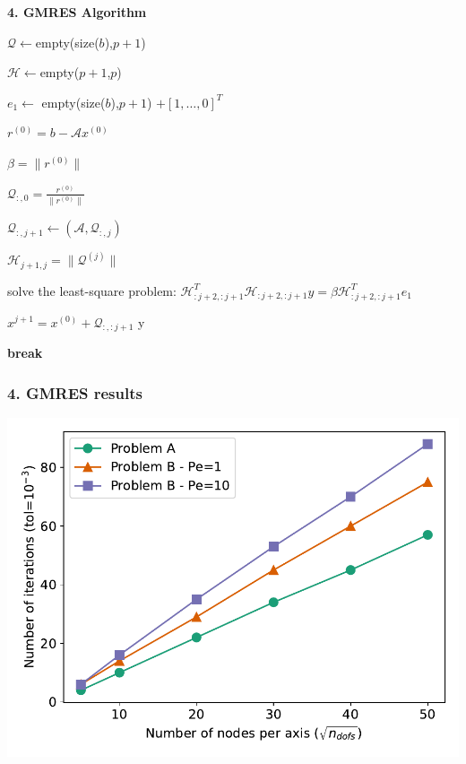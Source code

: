\begin{frame}[fragile]{\textbf{4. GMRES Algorithm}}

\begin{algorithm}[H]

	$\mathcal{Q}\leftarrow$empty(size($b$),$p+1$)
	
	$\mathcal{H}\leftarrow$empty($p+1$,$p$)
	
	$e_1 \leftarrow$ empty(size($b$),$p+1$) $ + [1,\dots,0]^T$
	
	$r^{(0)} = b-\mathcal{A}x^{(0)}$
	
	$\beta = \lVert r^{(0)} \rVert$

	
	$\mathcal{Q}_{:,0} = \frac{r^{(0)}}{\lVert r^{(0)} \rVert}$
	
	

	{
	   $\mathcal{Q}_{:,j+1} \leftarrow (\mathcal{A},\mathcal{Q}_{:,j})$
	   
	   
	   $\mathcal{H}_{j+1,j} = \lVert \mathcal{Q}^{(j)} \rVert$
	   

	  
	  solve the least-square problem: $\mathcal{H}_{:j+2,:j+1}^{T} \mathcal{H}_{:j+2,:j+1} y = \beta \mathcal{H}_{:j+2,:j+1}^{T}  e_1$
	
	  $x^{j+1} = x^{(0)} + \mathcal{Q}_{:,:j+1}$ y
	  
	  {
	  	\textbf{break}
	  }
	}
\end{algorithm}

\end{frame}

\begin{frame}
	\frametitle{\textbf{4. GMRES results}}
	\centering
	\includegraphics[width=0.95\linewidth]{images/gmres_its}
\end{frame}


